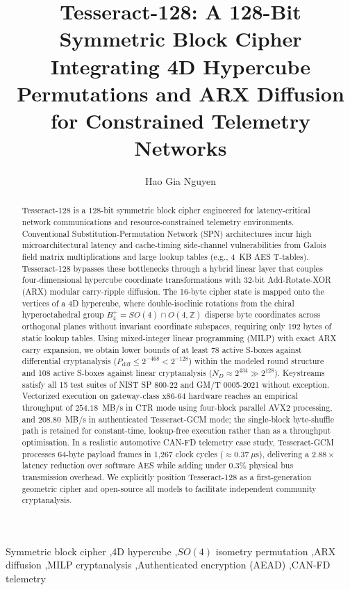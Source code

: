 \documentclass[review,12pt]{elsarticle}
\begin{document}
\begin{frontmatter}

\title{Tesseract-128: A 128-Bit Symmetric Block Cipher Integrating 4D Hypercube Permutations and ARX Diffusion for Constrained Telemetry Networks}

\author{Hao Gia Nguyen}


\begin{abstract}
Tesseract-128 is a 128-bit symmetric block cipher engineered for latency-critical network communications and resource-constrained telemetry environments. Conventional Substitution-Permutation Network (SPN) architectures incur high microarchitectural latency and cache-timing side-channel vulnerabilities from Galois field matrix multiplications and large lookup tables (e.g., 4~KB AES T-tables). Tesseract-128 bypasses these bottlenecks through a hybrid linear layer that couples four-dimensional hypercube coordinate transformations with 32-bit Add-Rotate-XOR (ARX) modular carry-ripple diffusion. The 16-byte cipher state is mapped onto the vertices of a 4D hypercube, where double-isoclinic rotations from the chiral hyperoctahedral group $B_4^+ = SO(4) \cap O(4, \mathbb{Z})$ disperse byte coordinates across orthogonal planes without invariant coordinate subspaces, requiring only 192 bytes of static lookup tables. Using mixed-integer linear programming (MILP) with exact ARX carry expansion, we obtain lower bounds of at least 78 active S-boxes against differential cryptanalysis ($P_{\text{diff}} \le 2^{-468} < 2^{-128}$) within the modeled round structure and 108 active S-boxes against linear cryptanalysis ($N_D \approx 2^{434} \gg 2^{128}$). Keystreams satisfy all 15 test suites of NIST SP 800-22 and GM/T 0005-2021 without exception. Vectorized execution on gateway-class x86-64 hardware reaches an empirical throughput of $254.18$~MB/s in CTR mode using four-block parallel AVX2 processing, and $208.80$~MB/s in authenticated Tesseract-GCM mode; the single-block byte-shuffle path is retained for constant-time, lookup-free execution rather than as a throughput optimisation. In a realistic automotive CAN-FD telemetry case study, Tesseract-GCM processes 64-byte payload frames in 1,267 clock cycles ($\approx 0.37~\mu\text{s}$), delivering a $2.88\times$ latency reduction over software AES while adding under $0.3\%$ physical bus transmission overhead. We explicitly position Tesseract-128 as a first-generation geometric cipher and open-source all models to facilitate independent community cryptanalysis.
\end{abstract}

\begin{keyword}
Symmetric block cipher \sep 4D hypercube \sep $SO(4)$ isometry permutation \sep ARX diffusion \sep MILP cryptanalysis \sep Authenticated encryption (AEAD) \sep CAN-FD telemetry
\end{keyword}

\end{frontmatter}
\end{document}
